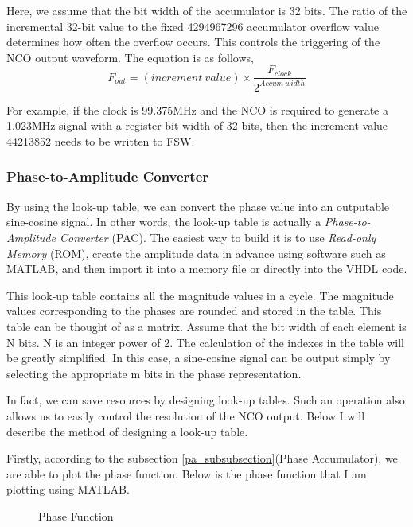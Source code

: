 Here, we assume that the bit width of the accumulator is 32 bits. The ratio of the incremental 32-bit value to the fixed \num{4294967296} accumulator overflow value determines how often the overflow occurs. This controls the triggering of the NCO output waveform. The equation is as follows,
\begin{equation}
    F_{out} = (increment\ value) \times \frac{F_{clock}}{2^{Accum\ width}}
\end{equation}

For example, if the clock is 99.375MHz and the NCO is required to generate a 1.023MHz signal with a register bit width of 32 bits, then the increment value \num{44213852} needs to be written to FSW.

\subsubsection{Phase-to-Amplitude Converter}
By using the look-up table, we can convert the phase value into an outputable sine-cosine signal. In other words, the look-up table is actually a \textit{Phase-to-Amplitude Converter} (PAC). The easiest way to build it is to use \textit{Read-only Memory} (ROM)\cite{RN190}, create the amplitude data in advance using software such as MATLAB, and then import it into a memory file or directly into the VHDL code.

This look-up table contains all the magnitude values in a cycle. The magnitude values corresponding to the phases are rounded and stored in the table. This table can be thought of as a matrix. Assume that the bit width of each element is N bits. N is an integer power of 2. The calculation of the indexes in the table will be greatly simplified\cite{RN194}. In this case, a sine-cosine signal can be output simply by selecting the appropriate m bits in the phase representation.

In fact, we can save resources by  designing look-up tables\cite{RN193}. Such an operation also allows us to easily control the resolution of the NCO output. Below I will describe the method of designing a look-up table.

Firstly, according to the subsection \ref{pa_subsubsection}(Phase Accumulator), we are able to plot the phase function. Below is the phase function that I am plotting using MATLAB.

\begin{figure}[!htbp]
    \centering
    
    \caption{Phase Function}
    \label{fig:phase_function}
\end{figure}

